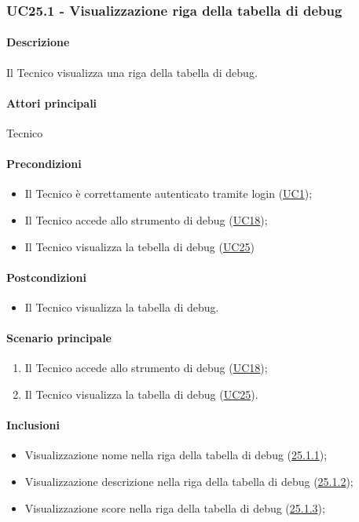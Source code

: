 
\subsubsection{UC25.1 - Visualizzazione riga della tabella di debug}\label{UC25point1}
\paragraph*{Descrizione}
Il Tecnico visualizza una riga della tabella di debug. 

\paragraph*{Attori principali}
Tecnico

\paragraph*{Precondizioni}
\begin{itemize}
  \item Il Tecnico è correttamente autenticato tramite login (\hyperref[UC1]{UC1});
  \item Il Tecnico accede allo strumento di debug (\hyperref[UC18]{UC18});
  \item Il Tecnico visualizza la tebella di debug (\hyperref[UC25]{UC25})
\end{itemize}

\paragraph*{Postcondizioni}
\begin{itemize}
  \item Il Tecnico visualizza la tabella di debug.
\end{itemize}

\paragraph*{Scenario principale}
\begin{enumerate}
  \item Il Tecnico accede allo strumento di debug (\hyperref[UC18]{UC18});
  \item Il Tecnico visualizza la tabella di debug (\hyperref[UC25]{UC25}). 
\end{enumerate}

\paragraph*{Inclusioni}
\begin{itemize}
    \item Visualizzazione nome nella riga della tabella di debug (\hyperref[UC25poin1point1]{25.1.1});
    \item Visualizzazione descrizione nella riga della tabella di debug (\hyperref[UC25poin1point2]{25.1.2});
    \item Visualizzazione score nella riga della tabella di debug (\hyperref[UC25poin1point3]{25.1.3});
\end{itemize}

